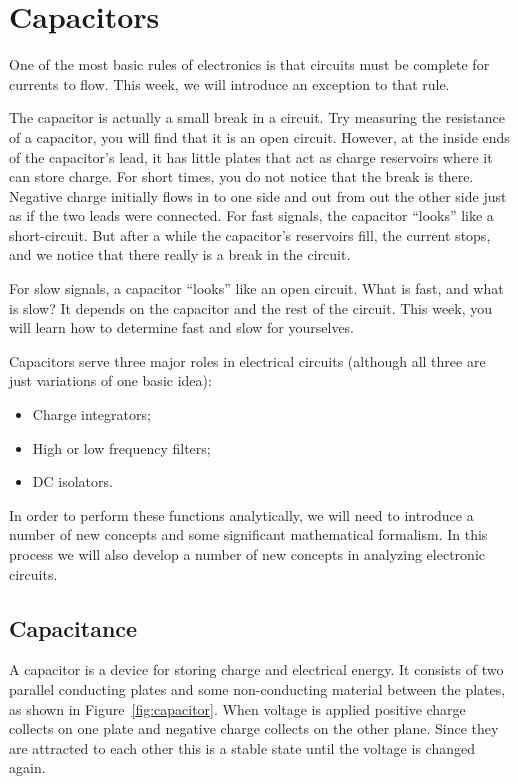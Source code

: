 \documentclass{article}
\begin{document}
\section{Capacitors}
One of the most basic rules of electronics is that circuits must be complete for currents to flow. This week, we will introduce an exception to that rule.

The capacitor is actually a small break in a circuit. Try measuring the resistance of a capacitor, you will find that it is an open circuit. However, at the inside ends of the capacitor's lead, it has little plates that act as charge reservoirs where it can store charge. For short times, you do not notice that the break is there. Negative charge initially flows in to one side and out from out the other side just as if the two leads were connected. For fast signals, the capacitor ``looks'' like a short-circuit. But after a while the capacitor's reservoirs fill, the current stops, and we notice that there really is a break in the circuit.

For slow signals, a capacitor ``looks'' like an open circuit. What is fast, and what is slow? It depends on the capacitor and the rest of the circuit. This week, you will learn how to determine fast and slow for yourselves.

Capacitors serve three major roles in electrical circuits (although all three are just variations of one basic idea):
\begin{itemize}
\item Charge integrators;
\item High or low frequency filters;
\item DC isolators.
\end{itemize}

In order to perform these functions analytically, we will need to introduce a number of new concepts and some significant mathematical formalism. In this process we will also develop a number of new concepts in analyzing electronic circuits.

\subsection{Capacitance}
A capacitor is a device for storing charge and electrical energy. It consists of two parallel conducting plates and some non-conducting material between the plates, as shown in Figure~\ref{fig:capacitor}. When voltage is applied positive charge collects on one plate and negative charge collects on the other plane. Since they are attracted to each other this is a stable state until the voltage is changed again.
\end{document}
